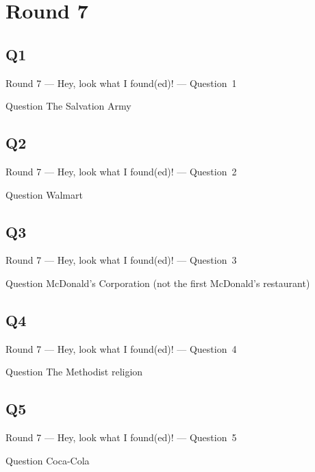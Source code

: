 \documentclass[11pt]{beamer}
\begin{document}
\section{Round 7}
\subsection*{Q1}
\begin{frame}[t]{Round 7 --- Hey, look what I found(ed)! --- \mbox{Question 1}}
\vspace{-0.5em}
\begin{block}{Question}
The Salvation Army 
\end{block}
\end{frame}
\subsection*{Q2}
\begin{frame}[t]{Round 7 --- Hey, look what I found(ed)! --- \mbox{Question 2}}
\vspace{-0.5em}
\begin{block}{Question}
Walmart
\end{block}
\end{frame}
\subsection*{Q3}
\begin{frame}[t]{Round 7 --- Hey, look what I found(ed)! --- \mbox{Question 3}}
\vspace{-0.5em}
\begin{block}{Question}
McDonald's Corporation (not the first McDonald's restaurant)
\end{block}
\end{frame}
\subsection*{Q4}
\begin{frame}[t]{Round 7 --- Hey, look what I found(ed)! --- \mbox{Question 4}}
\vspace{-0.5em}
\begin{block}{Question}
The Methodist religion
\end{block}
\end{frame}
\subsection*{Q5}
\begin{frame}[t]{Round 7 --- Hey, look what I found(ed)! --- \mbox{Question 5}}
\vspace{-0.5em}
\begin{block}{Question}
Coca-Cola
\end{block}
\end{frame}
\end{document}
